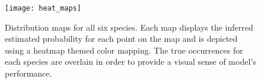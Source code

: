 \begin{figure}
    \texttt{[image: heat\_maps]}
    \caption{
        Distribution maps for all six species.
        Each map displays the inferred estimated probability for each point on the map and is depicted using a heatmap themed color mapping.
        The true occurrences for each species are overlain in order to provide a visual sense of model's performance.
    }
    \label{fig:heat_maps}
\end{figure}